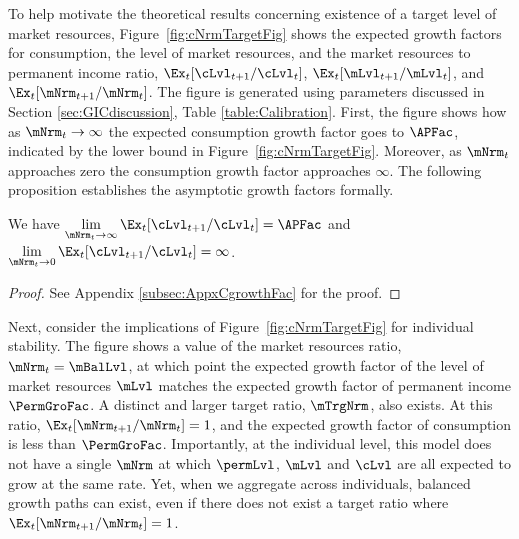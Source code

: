 \documentclass[BufferStockTheory]{subfiles}
\begin{document}
To help motivate the theoretical results concerning existence of a target level of market resources, Figure~\ref{fig:cNrmTargetFig} shows the expected growth factors for consumption, the level of market resources, and the market resources to permanent income ratio, $\Ex_{t}[\cLvl_{t+1}/\cLvl_{t}]$, $\Ex_{t}[\mLvl_{t+1}/\mLvl_{t}]$, and $\Ex_{t}[\mNrm_{t+1}/\mNrm_{t}]$.
The figure is generated using parameters discussed in Section \ref{sec:GICdiscussion}, Table \ref{table:Calibration}.
First, the figure shows how as $\mNrm_{t} \rightarrow \infty$ the expected consumption growth factor goes to ${\APFac}$, indicated by the lower bound in Figure~\ref{fig:cNrmTargetFig}.
Moreover, as $\mNrm_{t}$ approaches zero the consumption growth factor approaches $\infty$.
The following proposition establishes the asymptotic growth factors formally.


\begin{proposition}\label{prop:convgGrowth}\hypertarget{LimitsAsmtToZero}{}
We have $\lim\limits_{\mNrm_{t} \rightarrow \infty} \Ex_{t}[\cLvl_{t+1}/\cLvl_{t}] =  {\APFac}$ and $\lim\limits_{\mNrm_{t} \rightarrow  0} \Ex_{t}[\cLvl_{t+1}/\cLvl_{t}] =  \infty$. 
\end{proposition}
\begin{proof}\let\qed\relax
See Appendix \ref{subsec:AppxCgrowthFac} for the proof.

\end{proof}

Next, consider the implications of Figure~\ref{fig:cNrmTargetFig} for individual stability.
The figure shows a value of the market resources ratio, $\mNrm_{t} = \mBalLvl$, at which point the expected growth factor of the level of market resources $\mLvl$ matches the expected growth factor of permanent income $\PermGroFac$.
A distinct and larger target ratio, $\mTrgNrm$, also exists.
At this ratio, $\Ex_{t}[\mNrm_{t+1}/\mNrm_{t}]=1$, and the expected growth factor of consumption is less than $\PermGroFac$.
Importantly, at the individual level, this model does not have a single $\mNrm$ at which $\permLvl$, $\mLvl$ and $\cLvl$ are all expected to grow at the same rate.
Yet, when we aggregate across individuals, balanced growth paths can exist, even if there does not exist a target ratio where $\Ex_{t}[\mNrm_{t+1}/\mNrm_{t}]=1$.
\end{document}

